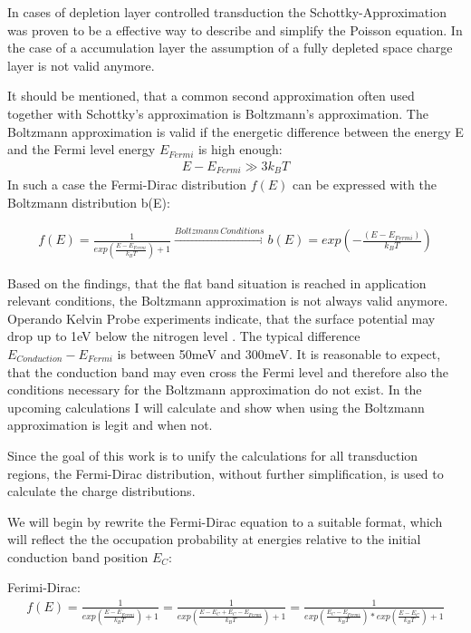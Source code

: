 \documentclass[11pt]{article}
\begin{document}
In cases of depletion layer controlled transduction the
Schottky-Approximation was proven to be a effective way to describe and
simplify the Poisson equation. In the case of a accumulation layer the
assumption of a fully depleted space charge layer is not valid anymore.

It should be mentioned, that a common second approximation often used
together with Schottky's approximation is Boltzmann's approximation. The
Boltzmann approximation is valid if the energetic difference between the
energy E and the Fermi level energy \(E_{Fermi}\) is high enough:
\begin{align}
E-E_{Fermi}\gg3k_{B}T
\end{align} In such a case the Fermi-Dirac distribution \(f(E)\) can be
expressed with the Boltzmann distribution b(E):

\begin{align}
f(E)=\frac{1}{exp(\frac{E-E_{Fermi}}{k_{B}T})+1}\xrightarrow{Boltzmann\,Conditions}b(E)=exp(-\frac{(E-E_{Fermi})}{k_{B}T})
\end{align}

Based on the findings, that the flat band situation is reached in
application relevant conditions, the Boltzmann approximation is not
always valid anymore. Operando Kelvin Probe experiments indicate, that
the surface potential may drop up to 1eV below the nitrogen level
\cite{Barsan2015}. The typical difference \(E_{Conduction}-E_{Fermi}\)
is between 50meV and 300meV. It is reasonable to expect, that the
conduction band may even cross the Fermi level and therefore also the
conditions necessary for the Boltzmann approximation do not exist. In
the upcoming calculations I will calculate and show when using the
Boltzmann approximation is legit and when not.

Since the goal of this work is to unify the calculations for all
transduction regions, the Fermi-Dirac distribution, without further
simplification, is used to calculate the charge distributions.

We will begin by rewrite the Fermi-Dirac equation to a suitable format,
which will reflect the the occupation probability at energies relative
to the initial conduction band position \(E_C\):

Ferimi-Dirac: \begin{align}
f(E)=\frac{1}{exp(\frac{E-E_{Fermi}}{k_{B}T})+1}=\frac{1}{exp(\frac{E-E_{C}+E_{C}-E_{Fermi}}{k_{B}T})+1}=\frac{1}{exp(\frac{E_{C}-E_{Fermi}}{k_{B}T})*exp(\frac{E-E_{C}}{k_{B}T})+1}\label{fermi}\tag{Fermi}
\end{align}
\end{document}
